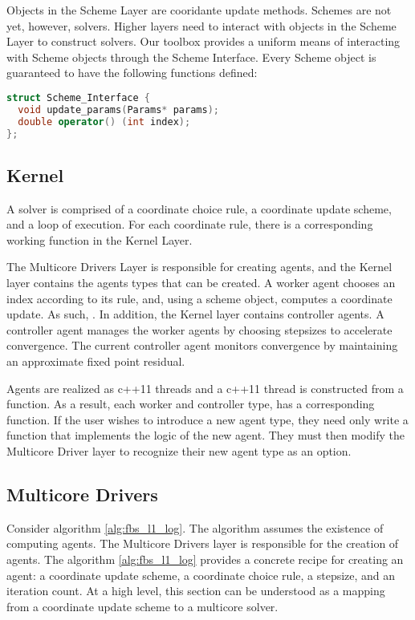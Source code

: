 Objects in the Scheme Layer are cooridante update methods.
Schemes are not yet, however, solvers.
Higher layers need to interact with objects in the Scheme Layer to construct solvers.
Our toolbox provides a uniform means of interacting with Scheme objects through the Scheme Interface.
Every Scheme object is guaranteed to have the following functions defined:

\begin{lstlisting}[language=C++]
struct Scheme_Interface {
  void update_params(Params* params);
  double operator() (int index);
};
\end{lstlisting}

\subsection{Kernel}

A solver is comprised of a coordinate choice rule, a coordinate update scheme, and a loop of execution.
For each coordinate rule, there is a corresponding working function in the Kernel Layer.

The Multicore Drivers Layer is responsible for creating agents, and the Kernel layer contains the agents types that can be created.
A worker agent chooses an index according to its rule, and, using a scheme object, computes a coordinate update.
As such, .
In addition, the Kernel layer contains controller agents.
A controller agent manages the worker agents by choosing stepsizes to accelerate convergence.
The current controller agent monitors convergence by maintaining an approximate fixed point residual.

Agents are realized as c++11 threads and a c++11 thread is constructed from a function.
As a result, each worker and controller type, has  a corresponding function.
If the user wishes to introduce a new agent type, they need only write a function that implements the logic of the new agent.
They must then modify the Multicore Driver layer to recognize their new agent type as an option.




\subsection{Multicore Drivers}


Consider algorithm \ref{alg:fbs_l1_log}.
 The algorithm assumes the existence of computing agents.
The Multicore Drivers  layer is responsible for the creation of agents.
The  algorithm \ref{alg:fbs_l1_log} provides a concrete recipe for creating an agent: a coordinate update scheme, a coordinate choice rule, a stepsize, and an iteration count.
At a high level, this section can be understood as a mapping from a coordinate update scheme to a multicore solver.

